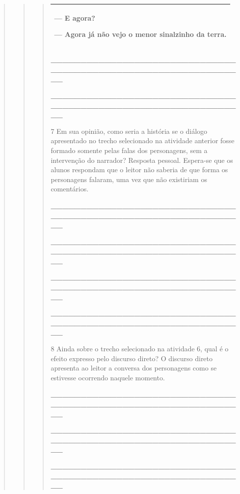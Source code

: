 \begin{boxlist}
{{\begin{quote}
\begin{quote}
\begin{quote}
{\begin{longtable}[]{@{}l@{}}
\begin{minipage}[t]{0.97\columnwidth}
--- E agora?

--- Agora já não vejo o menor sinalzinho da terra.\strut
\end{minipage}\tabularnewline
\bottomrule
\end{longtable}

\protect\hypertarget{_Hlk127806075}{}{}\textbf{\_\_\_\_\_\_\_\_\_\_\_\_\_\_\_\_\_\_\_\_\_\_\_\_\_\_\_\_\_\_\_\_\_\_\_\_\_\_\_\_\_\_\_\_\_\_\_\_\_\_\_\_\_\_\_\_\_\_\_\_\_\_\_\_}

\textbf{\_\_\_\_\_\_\_\_\_\_\_\_\_\_\_\_\_\_\_\_\_\_\_\_\_\_\_\_\_\_\_\_\_\_\_\_\_\_\_\_\_\_\_\_\_\_\_\_\_\_\_\_\_\_\_\_\_\_\_\_\_\_\_\_}

\num{7} Em sua opinião, como seria a história se o diálogo apresentado no trecho selecionado na atividade anterior fosse formado
somente pelas falas dos personagens, sem a intervenção do narrador?
Resposta pessoal. Espera-se que os alunos respondam que o leitor não
saberia de que forma os personagens falaram, uma vez que não existiriam
os comentários.

\textbf{\_\_\_\_\_\_\_\_\_\_\_\_\_\_\_\_\_\_\_\_\_\_\_\_\_\_\_\_\_\_\_\_\_\_\_\_\_\_\_\_\_\_\_\_\_\_\_\_\_\_\_\_\_\_\_\_\_\_\_\_\_\_\_\_}

\textbf{\_\_\_\_\_\_\_\_\_\_\_\_\_\_\_\_\_\_\_\_\_\_\_\_\_\_\_\_\_\_\_\_\_\_\_\_\_\_\_\_\_\_\_\_\_\_\_\_\_\_\_\_\_\_\_\_\_\_\_\_\_\_\_\_}

\textbf{\_\_\_\_\_\_\_\_\_\_\_\_\_\_\_\_\_\_\_\_\_\_\_\_\_\_\_\_\_\_\_\_\_\_\_\_\_\_\_\_\_\_\_\_\_\_\_\_\_\_\_\_\_\_\_\_\_\_\_\_\_\_\_\_}

\textbf{\_\_\_\_\_\_\_\_\_\_\_\_\_\_\_\_\_\_\_\_\_\_\_\_\_\_\_\_\_\_\_\_\_\_\_\_\_\_\_\_\_\_\_\_\_\_\_\_\_\_\_\_\_\_\_\_\_\_\_\_\_\_\_\_}

\num{8} Ainda sobre o trecho selecionado na atividade 6, qual é o efeito expresso pelo discurso direto? O discurso
direto apresenta ao leitor a conversa dos personagens como se estivesse
ocorrendo naquele momento.

\textbf{\_\_\_\_\_\_\_\_\_\_\_\_\_\_\_\_\_\_\_\_\_\_\_\_\_\_\_\_\_\_\_\_\_\_\_\_\_\_\_\_\_\_\_\_\_\_\_\_\_\_\_\_\_\_\_\_\_\_\_\_\_\_\_\_}

\protect\hypertarget{_Hlk127808036}{}{}\textbf{\_\_\_\_\_\_\_\_\_\_\_\_\_\_\_\_\_\_\_\_\_\_\_\_\_\_\_\_\_\_\_\_\_\_\_\_\_\_\_\_\_\_\_\_\_\_\_\_\_\_\_\_\_\_\_\_\_\_\_\_\_\_\_\_}

\textbf{\_\_\_\_\_\_\_\_\_\_\_\_\_\_\_\_\_\_\_\_\_\_\_\_\_\_\_\_\_\_\_\_\_\_\_\_\_\_\_\_\_\_\_\_\_\_\_\_\_\_\_\_\_\_\_\_\_\_\_\_\_\_\_\_}

}
\end{quote}
\end{quote}
\end{quote}}}
\end{boxlist}
